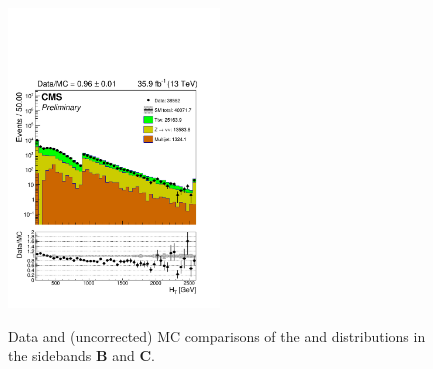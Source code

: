 \begin{figure}[!h]
{    \includegraphics[width=0.5\textwidth]{figures/qcd/distributions/bdphisb_ht40}
  }
  \caption{Data and (uncorrected) MC comparisons of the \scalht and \njet
    distributions in the sidebands \textbf{B} and \textbf{C}.}
  \label{fig:qcd_distributions_1}
\end{figure}

